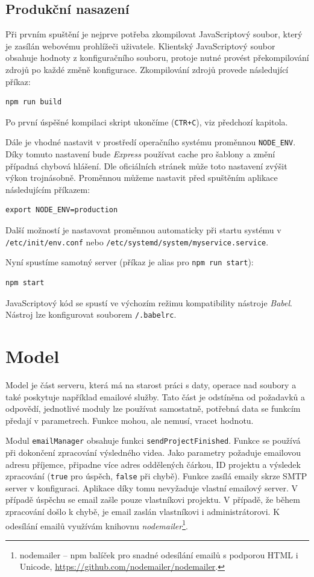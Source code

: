 \subsection{Produkční nasazení}
Při prvním spuštění je nejprve potřeba zkompilovat JavaScriptový soubor, který je zasílán webovému prohlížeči uživatele. Klientský JavaScriptový soubor obsahuje hodnoty z konfiguračního souboru, protoje nutné provést překompilování zdrojů po každé změně konfigurace. Zkompilování zdrojů provede následující příkaz:
\begin{lstlisting}[style=bash]
npm run build
\end{lstlisting}
Po první úspěšné kompilaci skript ukončíme (\texttt{CTR+C}), viz předchozí kapitola.

Dále je vhodné nastavit v prostředí operačního systému proměnnou \texttt{NODE\_ENV}. Díky tomuto nastavení bude \textit{Express} používat cache pro šablony a změní případná chybová hlášení. Dle oficiálních stránek může toto nastavení zvýšit výkon trojnásobně. Proměnnou můžeme nastavit před spuštěním aplikace následujícím příkazem:
\begin{lstlisting}[style=bash]
export NODE_ENV=production
\end{lstlisting}
Další možností je nastavovat proměnnou automaticky při startu systému v \texttt{/etc/init/env.conf} nebo \texttt{/etc/systemd/system/myservice.service}.\,\cite{express}

Nyní spustíme samotný server (příkaz je alias pro \texttt{npm run start}):
\begin{lstlisting}[style=bash]
npm start
\end{lstlisting}
JavaScriptový kód se spustí ve výchozím režimu kompatibility nástroje \textit{Babel}. Nástroj lze konfigurovat souborem \texttt{/.babelrc}.

\section{Model}
Model je část serveru, která má na starost práci s daty, operace nad soubory a také poskytuje například emailové služby. Tato část je odstíněna od požadavků a odpovědí, jednotlivé moduly lze používat samostatně, potřebná data se funkcím předají v parametrech. Funkce mohou, ale nemusí, vracet hodnotu.

Modul \texttt{emailManager} obsahuje funkci \texttt{sendProjectFinished}. Funkce se používá při dokončení zpracování výsledného videa. Jako parametry požaduje emailovou adresu příjemce, připadne více adres oddělených čárkou, ID projektu a výsledek zpracování (\texttt{true} pro úspěch, \texttt{false} při chybě). Funkce zasílá emaily skrze SMTP server v konfiguraci. Aplikace díky tomu nevyžaduje vlastní emailový server. V případě úspěchu se email zašle pouze vlastníkovi projektu. V případě, že během zpracování došlo k chybě, je email zaslán vlastníkovi i administrátorovi. K odesílání emailů využívám knihovnu \textit{nodemailer}\footnote{nodemailer -- npm balíček pro snadné odesílání emailů s podporou HTML i Unicode, \url{https://github.com/nodemailer/nodemailer}.}.

